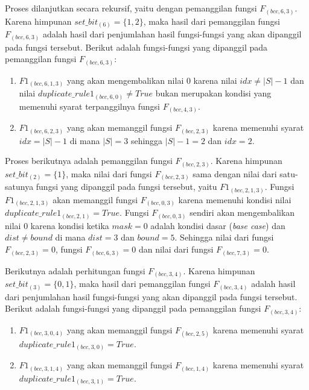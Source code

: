 Proses dilanjutkan secara rekursif, yaitu dengan pemanggilan fungsi $ F_{(bcc, 6, 3)} $. Karena himpunan $ set\_bit_{(6)} = \{1, 2\} $, maka hasil dari pemanggilan fungsi $ F_{(bcc, 6, 3)} $ adalah hasil dari penjumlahan hasil fungsi-fungsi yang akan dipanggil pada fungsi tersebut. Berikut adalah fungsi-fungsi yang dipanggil pada pemanggilan fungsi $ F_{(bcc, 6, 3)} $:
\begin{enumerate}
	\item $ F1_{(bcc, 6, 1, 3)} $ yang akan mengembalikan nilai $ 0 $ karena nilai $ idx \neq |S| - 1 $ dan nilai $ duplicate\_rule1_{(bcc, 6, 0)} \neq True$ bukan merupakan kondisi yang memenuhi syarat terpanggilnya fungsi $ F_{(bcc, 4, 3)} $.
	\item $ F1_{(bcc, 6, 2, 3)} $ yang akan memanggil fungsi $ F_{(bcc, 2, 3)} $ karena memenuhi syarat $ idx = |S| - 1 $ di mana $ |S| = 3 $ sehingga $ |S|-1 = 2 $ dan $ idx=2 $.
\end{enumerate}

Proses berikutnya adalah pemanggilan fungsi $ F_{(bcc, 2, 3)} $. Karena himpunan $ set\_bit_{(2)} = \{1\} $, maka nilai dari fungsi $ F_{(bcc, 2, 3)} $ sama dengan nilai dari satu-satunya fungsi yang dipanggil pada fungsi tersebut, yaitu $ F1_{(bcc, 2, 1, 3)} $. Fungsi $ F1_{(bcc, 2, 1, 3)} $ akan memanggil fungsi $ F_{(bcc, 0, 3)} $ karena memenuhi kondisi nilai $ duplicate\_rule1_{(bcc, 2, 1)} = True$. Fungsi $ F_{(bcc, 0, 3)} $ sendiri akan mengembalikan nilai $ 0 $ karena kondisi ketika $ mask = 0 $ adalah kondisi dasar (\textit{base case}) dan $ dist \neq bound$ di mana $ dist = 3$ dan $ bound=5 $. Sehingga nilai dari fungsi $ F_{(bcc, 2, 3)} =0$, fungsi $ F_{(bcc, 6, 3)} =0$ dan nilai dari fungsi $ F_{(bcc, 7, 3)} = 0$.

Berikutnya adalah perhitungan fungsi $ F_{(bcc, 3, 4)} $.  Karena himpunan $ set\_bit_{(3)} = \{0, 1\} $, maka hasil dari pemanggilan fungsi $ F_{(bcc, 3, 4)} $ adalah hasil dari penjumlahan hasil fungsi-fungsi yang akan dipanggil pada fungsi tersebut. Berikut adalah fungsi-fungsi yang dipanggil pada pemanggilan fungsi $ F_{(bcc, 3, 4)} $:
\begin{enumerate}
	\item $ F1_{(bcc, 3, 0, 4)} $ yang akan memanggil fungsi $ F_{(bcc, 2, 5)} $ karena memenuhi syarat $ duplicate\_rule1_{(bcc, 3, 0)} = True$.
	\item $ F1_{(bcc, 3, 1, 4)} $ yang akan memanggil fungsi $ F_{(bcc, 1, 4)} $ karena memenuhi syarat $ duplicate\_rule1_{(bcc, 3, 1)} = True$.
\end{enumerate}

